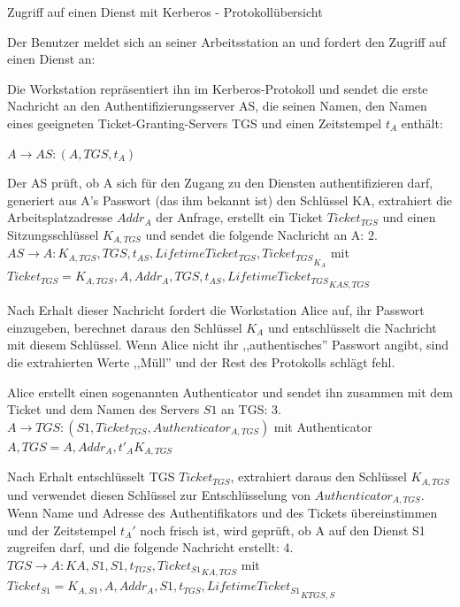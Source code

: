 \documentclass[a4paper]{article}
\begin{document}
\begin{multicols}{3}
      Zugriff auf einen Dienst mit Kerberos - Protokollübersicht
      \begin{itemize*}
            \item Der Benutzer meldet sich an seiner Arbeitsstation an und fordert den Zugriff auf einen Dienst an:
            \begin{itemize*}
                  \item Die Workstation repräsentiert ihn im Kerberos-Protokoll und sendet die erste Nachricht an den Authentifizierungsserver AS, die seinen Namen, den Namen eines geeigneten Ticket-Granting-Servers TGS und einen Zeitstempel $t_A$ enthält:
            \end{itemize*}
            \begin{enumerate*}
                  \item $A\rightarrow AS:(A, TGS, t_A)$
            \end{enumerate*}
            \item Der AS prüft, ob A sich für den Zugang zu den Diensten authentifizieren darf, generiert aus A's Passwort (das ihm bekannt ist) den Schlüssel KA, extrahiert die Arbeitsplatzadresse $Addr_A$ der Anfrage, erstellt ein Ticket $Ticket_{TGS}$ und einen Sitzungsschlüssel $K_{A,TGS}$ und sendet die folgende Nachricht an A: 2. $AS\rightarrow A:{ K_{A,TGS}, TGS, t_{AS}, LifetimeTicket_{TGS}, Ticket_{TGS}}_{K_A}$ mit $Ticket_{TGS}={K_{A,TGS},A, Addr_A, TGS, t_{AS}, LifetimeTicket_{TGS}}_{{K}{AS,TGS}}$
            \item Nach Erhalt dieser Nachricht fordert die Workstation Alice auf, ihr Passwort einzugeben, berechnet daraus den Schlüssel $K_A$ und entschlüsselt die Nachricht mit diesem Schlüssel. Wenn Alice nicht ihr ,,authentisches'' Passwort angibt, sind die extrahierten Werte ,,Müll'' und der Rest des Protokolls schlägt fehl.
            \item Alice erstellt einen sogenannten Authenticator und sendet ihn zusammen mit dem Ticket und dem Namen des Servers $S1$ an TGS: 3. $A\rightarrow TGS:(S1, Ticket_{TGS}, Authenticator_{A,TGS})$ mit Authenticator $A,TGS={A,Addr_A,t'_{A}}{K_{A,TGS}}$
            \item Nach Erhalt entschlüsselt TGS $Ticket_{TGS}$, extrahiert daraus den Schlüssel $K_{A,TGS}$ und verwendet diesen Schlüssel zur Entschlüsselung von $Authenticator_{A,TGS}$. Wenn Name und Adresse des Authentifikators und des Tickets übereinstimmen und der Zeitstempel $t_A'$ noch frisch ist, wird geprüft, ob A auf den Dienst S1 zugreifen darf, und die folgende Nachricht erstellt: 4. $TGS\rightarrow A:{{K}{A,S1}, S1, t_{TGS}, Ticket_{S1}}_{{K}{A,TGS}}$ mit $Ticket_{S1}={K_{A,S1}, A, Addr_A, S1, t_{TGS}, LifetimeTicket_{S1}}_{{K}{TGS,S}}$

\end{itemize*}
\end{multicols}
\end{document}
